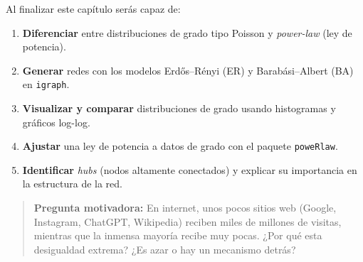 \documentclass[
  letterpaper,
  DIV=11,
  numbers=noendperiod]{scrreprt}
\providecommand{\tightlist}{%
  \setlength{\itemsep}{0pt}\setlength{\parskip}{0pt}}
\begin{document}
\begin{tcolorbox}[enhanced jigsaw, toprule=.15mm, colframe=quarto-callout-note-color-frame, coltitle=black, titlerule=0mm, colback=white, breakable, leftrule=.75mm, arc=.35mm, bottomtitle=1mm, toptitle=1mm, rightrule=.15mm, bottomrule=.15mm, left=2mm, title=\textcolor{quarto-callout-note-color}{\faInfo}\hspace{0.5em}{🎯 Objetivos de aprendizaje}, colbacktitle=quarto-callout-note-color!10!white, opacityback=0, opacitybacktitle=0.6]

Al finalizar este capítulo serás capaz de:

\begin{enumerate}
\def\labelenumi{\arabic{enumi}.}
\tightlist
\item
  \textbf{Diferenciar} entre distribuciones de grado tipo Poisson y
  \emph{power-law} (ley de potencia).
\item
  \textbf{Generar} redes con los modelos Erdős--Rényi (ER) y
  Barabási--Albert (BA) en \texttt{igraph}.
\item
  \textbf{Visualizar y comparar} distribuciones de grado usando
  histogramas y gráficos log-log.
\item
  \textbf{Ajustar} una ley de potencia a datos de grado con el paquete
  \texttt{poweRlaw}.
\item
  \textbf{Identificar} \emph{hubs} (nodos altamente conectados) y
  explicar su importancia en la estructura de la red.
\end{enumerate}

\end{tcolorbox}

\begin{quote}
\textbf{Pregunta motivadora:} En internet, unos pocos sitios web
(Google, Instagram, ChatGPT, Wikipedia) reciben miles de millones de
visitas, mientras que la inmensa mayoría recibe muy pocas. ¿Por qué esta
desigualdad extrema? ¿Es azar o hay un mecanismo detrás?
\end{quote}
\end{document}
